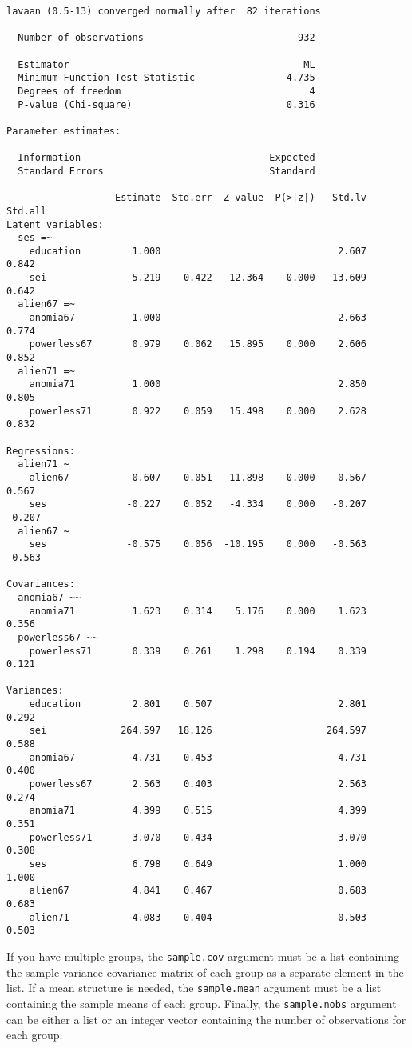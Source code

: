 \begin{verbatim}
lavaan (0.5-13) converged normally after  82 iterations

  Number of observations                           932

  Estimator                                         ML
  Minimum Function Test Statistic                4.735
  Degrees of freedom                                 4
  P-value (Chi-square)                           0.316

Parameter estimates:

  Information                                 Expected
  Standard Errors                             Standard

                   Estimate  Std.err  Z-value  P(>|z|)   Std.lv  Std.all
Latent variables:
  ses =~
    education         1.000                               2.607    0.842
    sei               5.219    0.422   12.364    0.000   13.609    0.642
  alien67 =~
    anomia67          1.000                               2.663    0.774
    powerless67       0.979    0.062   15.895    0.000    2.606    0.852
  alien71 =~
    anomia71          1.000                               2.850    0.805
    powerless71       0.922    0.059   15.498    0.000    2.628    0.832

Regressions:
  alien71 ~
    alien67           0.607    0.051   11.898    0.000    0.567    0.567
    ses              -0.227    0.052   -4.334    0.000   -0.207   -0.207
  alien67 ~
    ses              -0.575    0.056  -10.195    0.000   -0.563   -0.563

Covariances:
  anomia67 ~~
    anomia71          1.623    0.314    5.176    0.000    1.623    0.356
  powerless67 ~~
    powerless71       0.339    0.261    1.298    0.194    0.339    0.121

Variances:
    education         2.801    0.507                      2.801    0.292
    sei             264.597   18.126                    264.597    0.588
    anomia67          4.731    0.453                      4.731    0.400
    powerless67       2.563    0.403                      2.563    0.274
    anomia71          4.399    0.515                      4.399    0.351
    powerless71       3.070    0.434                      3.070    0.308
    ses               6.798    0.649                      1.000    1.000
    alien67           4.841    0.467                      0.683    0.683
    alien71           4.083    0.404                      0.503    0.503
\end{verbatim}

If you have multiple groups, the \texttt{sample.cov} argument must be a
list containing the sample variance-covariance matrix of each group as a
separate element in the list. If a mean structure is needed, the
\texttt{sample.mean} argument must be a list containing the sample means
of each group. Finally, the \texttt{sample.nobs} argument can be either
a list or an integer vector containing the number of observations for
each group.
